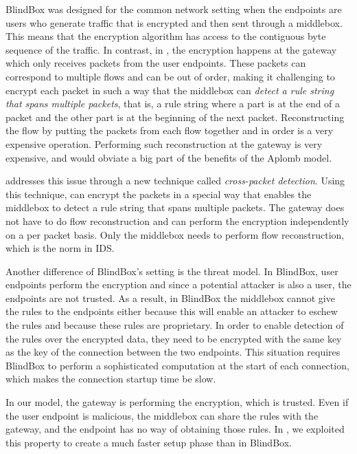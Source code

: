 BlindBox was designed for the common network setting when the endpoints are users who generate
traffic that is encrypted and then sent through a middlebox. This means that the encryption algorithm
has access to the contiguous byte sequence of the traffic. In contrast, in \sys, the encryption 
happens at the gateway 
which only receives packets from the user endpoints. 
These packets can correspond to multiple flows and can be out of order, 
making it challenging to encrypt each packet in such a way that the middlebox can  {\em detect 
a rule string that spans multiple packets}, that is, a rule string where a part is at the end of a packet and the other part is at the beginning of the next packet.  Reconstructing the flow by putting the packets from each flow together and in order  is a very expensive 
operation. Performing such reconstruction at the gateway is 
very expensive, and would obviate a big part of the benefits of the Aplomb model. 


\sys addresses this issue through a new technique called {\em cross-packet detection}. Using this technique,
\sys can encrypt the packets in a special way that enables the middlebox to detect a rule string that spans multiple
packets. The gateway does not have to do flow reconstruction and can perform the encryption 
independently on a per packet basis. Only the middlebox
needs to perform flow reconstruction, which is the norm in IDS. 


Another difference of BlindBox's setting is the threat model. In BlindBox, user
endpoints perform the encryption and since a potential attacker is also a user, 
the endpoints are not trusted. As a result, in BlindBox the middlebox cannot
give the rules to the endpoints either because this will enable an attacker to eschew the
rules and because these rules are proprietary. In order to enable detection of the rules
over the encrypted data, they need to be encrypted with the same key as the 
key of the connection between the two endpoints. This situation requires BlindBox to perform
a sophisticated computation at the start of each connection, which makes the connection
startup time be slow. 


In our model, the gateway is performing the encryption, which is trusted. Even if the
user endpoint is malicious, the middlebox can share the rules with the gateway, and the
endpoint has no way of obtaining those rules. In \sys, we exploited this property to create a
much faster setup phase than in BlindBox. 




